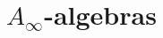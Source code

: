 \documentclass{beamer}
\theoremstyle{definition}
\begin{document}
\section{$A_\infty$-algebras}
%
%
%
%		
\end{document}
